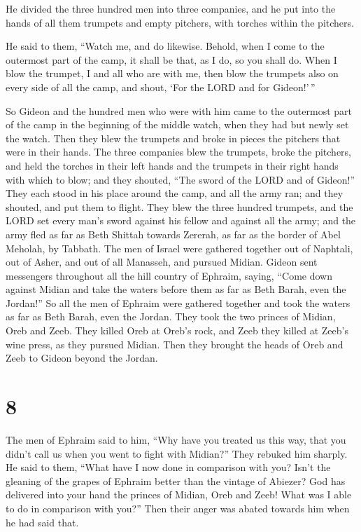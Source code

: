  He divided the three hundred men into three companies, and
he put into the hands of all them trumpets and empty pitchers, with
torches within the pitchers.

 He said to them, ``Watch me, and do likewise. Behold, when
I come to the outermost part of the camp, it shall be that, as I do, so
you shall do.  When I blow the trumpet, I and all who are
with me, then blow the trumpets also on every side of all the camp, and
shout, `For the LORD and for Gideon!'\,''

 So Gideon and the hundred men who were with him came to
the outermost part of the camp in the beginning of the middle watch,
when they had but newly set the watch. Then they blew the trumpets and
broke in pieces the pitchers that were in their hands.  The
three companies blew the trumpets, broke the pitchers, and held the
torches in their left hands and the trumpets in their right hands with
which to blow; and they shouted, ``The sword of the LORD and of
Gideon!''  They each stood in his place around the camp,
and all the army ran; and they shouted, and put them to flight.
 They blew the three hundred trumpets, and the LORD set
every man's sword against his fellow and against all the army; and the
army fled as far as Beth Shittah towards Zererah, as far as the border
of Abel Meholah, by Tabbath.  The men of Israel were
gathered together out of Naphtali, out of Asher, and out of all
Manasseh, and pursued Midian.  Gideon sent messengers
throughout all the hill country of Ephraim, saying, ``Come down against
Midian and take the waters before them as far as Beth Barah, even the
Jordan!'' So all the men of Ephraim were gathered together and took the
waters as far as Beth Barah, even the Jordan.  They took
the two princes of Midian, Oreb and Zeeb. They killed Oreb at Oreb's
rock, and Zeeb they killed at Zeeb's wine press, as they pursued Midian.
Then they brought the heads of Oreb and Zeeb to Gideon beyond the
Jordan.

\hypertarget{section-7}{%
\section{8}\label{section-7}}

 The men of Ephraim said to him, ``Why have you treated us
this way, that you didn't call us when you went to fight with Midian?''
They rebuked him sharply.  He said to them, ``What have I
now done in comparison with you? Isn't the gleaning of the grapes of
Ephraim better than the vintage of Abiezer?  God has
delivered into your hand the princes of Midian, Oreb and Zeeb! What was
I able to do in comparison with you?'' Then their anger was abated
towards him when he had said that.

